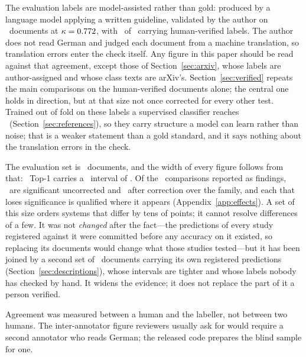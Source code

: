 \documentclass[11pt]{article}
\begin{document}
The evaluation labels are model-assisted rather than gold: produced by a
language model applying a written guideline, validated by the author on
\VerifyN\ documents at $\kappa = 0.772$, with \VerifyN\ of \NEVAL\ carrying human-verified
labels. The author does not read German and judged each document from a machine
translation, so translation errors enter the check itself. Any figure in this
paper should be read against that agreement, except those of
Section~\ref{sec:arxiv}, whose labels are author-assigned and whose class texts
are arXiv's. Section~\ref{sec:verified} repeats
the main comparisons on the human-verified documents alone; the central one
holds in direction, but at that size not once corrected for every other test.
Trained out of fold on these labels a supervised classifier reaches
\RefLRTopOne\ (Section~\ref{sec:references}), so they carry structure a model
can learn rather than noise; that is a weaker statement than a gold standard,
and it says nothing about the translation errors in the check.

The evaluation set is \NEVAL\ documents, and the width of every figure follows
from that: \OursTopOne\ Top-1 carries a \CILevel\ interval of \OursCI. Of the
\EffectTests\ comparisons reported as findings, \EffectNominal\ are
significant uncorrected and \EffectHolm\ after correction over the family, and
each that loses significance is qualified where it appears
(Appendix~\ref{app:effects}). A set of this size orders systems that differ by
tens of points; it cannot resolve differences of a few. It was not
\emph{changed} after the fact---the predictions of every study registered
against it were committed before any accuracy on it existed, so replacing its
documents would change what those studies tested---but it has been joined by a second set of
\ExtendedN\ documents carrying its own registered predictions
(Section~\ref{sec:descriptions}), whose intervals are tighter and whose labels
nobody has checked by hand. It widens the evidence; it does not replace the part
of it a person verified.

Agreement was measured between a human and the labeller, not between two humans.
The inter-annotator figure reviewers usually ask for would require a second
annotator who reads German; the released code prepares the blind sample for one.
\end{document}
